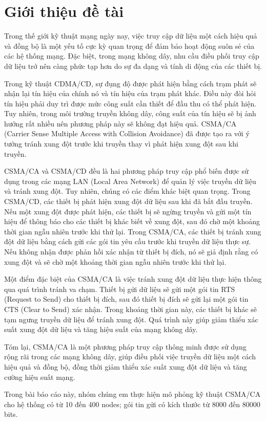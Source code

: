 %
\chapter{Giới thiệu đề tài}
Trong thế giới kỹ thuật mạng ngày nay, việc truy cập dữ liệu một cách hiệu quả và đồng bộ là một yếu tố cực kỳ 
quan trọng để đảm bảo hoạt động suôn sẻ của các hệ thống mạng. Đặc biệt, trong mạng không dây, nhu cầu điều phối 
truy cập dữ liệu trở nên càng phức tạp hơn do sự đa dạng và tính di động của các thiết bị. 

Trong kỹ thuật CDMA/CD, sự đụng độ được phát hiện bằng cách trạm phát sẽ nhận lại tín hiệu của chính nó và tín hiệu của
trạm phát khác. Điều này đòi hỏi tín hiệu phải duy trì được mức công suất cần thiết để đầu thu có thể phát hiện. Tuy nhiên, 
trong môi trường truyền không dây, công suất của tín hiệu sẽ bị ảnh hưởng rất nhiều nên phương pháp này sẽ không đạt hiệu quả.
CSMA/CA (Carrier Sense Multiple Access with Collision Avoidance) đã được tạo ra với ý tưởng tránh xung đột trước khi truyền thay vì phát 
hiện xung đột sau khi truyền.

CSMA/CA và CSMA/CD đều là hai phương pháp truy cập phổ biến được sử dụng trong các mạng LAN (Local Area Network) để quản 
lý việc truyền dữ liệu và tránh xung đột. Tuy nhiên, chúng có các điểm khác biệt quan trọng. Trong CSMA/CD, các thiết bị 
phát hiện xung đột dữ liệu sau khi đã bắt đầu truyền. Nếu một xung đột được phát hiện, các thiết bị sẽ ngừng truyền và gửi 
một tín hiệu để thông báo cho các thiết bị khác biết về xung đột, sau đó chờ một khoảng thời gian ngẫu nhiên trước khi thử lại.
Trong CSMA/CA, các thiết bị tránh xung đột dữ liệu bằng cách gửi các gói tin yêu cầu trước khi truyền dữ liệu thực sự. Nếu không 
nhận được phản hồi xác nhận từ thiết bị đích, nó sẽ giả định rằng có xung đột và sẽ chờ một khoảng thời gian ngẫu nhiên trước khi thử lại.

Một điểm đặc biệt của CSMA/CA là việc tránh xung đột dữ liệu thực hiện thông qua quá trình tránh va chạm. Thiết bị gửi dữ liệu sẽ 
gửi một gói tin RTS (Request to Send) cho thiết bị đích, sau đó thiết bị đích sẽ gửi lại một gói tin CTS (Clear to Send) xác nhận. 
Trong khoảng thời gian này, các thiết bị khác sẽ tạm ngưng truyền dữ liệu để tránh xung đột. Quá trình này giúp giảm thiểu xác suất 
xung đột dữ liệu và tăng hiệu suất của mạng không dây.

Tóm lại, CSMA/CA là một phương pháp truy cập thông minh được sử dụng rộng rãi trong các mạng không dây, giúp điều phối việc truyền dữ 
liệu một cách hiệu quả và đồng bộ, đồng thời giảm thiểu xác suất xung đột dữ liệu và tăng cường hiệu suất mạng.

Trong bài báo cáo này, nhóm chúng em thực hiện mô phỏng kỹ thuật CSMA/CA cho hệ thống có từ 10 đến 400 nodes; gói tin gửi có kích thước từ 8000
đến 80000 bits.
